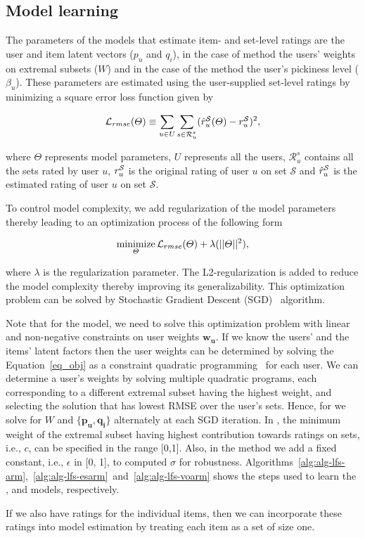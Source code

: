 \subsection{Model learning}\label{ch:lfs:model_learn}
The parameters of the models that estimate item- and set-level ratings are the
user and item latent vectors ($p_u$ and $q_i$), in the case of \ES method
the users' weights on extremal subsets ($W$) and in the case of the \VO method
the user's pickiness level ($\beta_u$). These parameters are estimated using the
user-supplied set-level ratings by minimizing a square error loss function given
by


%
\begin{equation} \label{eq_rmse}
  \mathcal{L}_{rmse}(\Theta) \equiv \sum_{u \in U} \sum_{\substack{s \in
  \mathcal{R}_{u}^s}} (\mbox{$\hat{r}_{u}^{\mathcal{S}}$}(\Theta) - \mbox{$r_{u}^{\mathcal{S}}$})^2,
\end{equation}
%


\noindent where $\Theta$ represents model parameters, $U$ represents all the users, $\mathcal{R}_{u}^s$ contains all the sets rated 
by user $u$, $\mbox{$r_{u}^{\mathcal{S}}$}$ is the original rating of user $u$ on set $\mathcal{S}$ 
and $\mbox{$\hat{r}_{u}^{\mathcal{S}}$}$ is the estimated rating of user $u$ on set $\mathcal{S}$.

To control model complexity, we add regularization of the model parameters
thereby leading to an optimization process of the following form

%
\begin{equation} \label{eq_obj}
  \minimize_{\Theta} \mathcal{L}_{rmse}(\Theta)  + \lambda (||\Theta||^2),
\end{equation}

%
\noindent where $\lambda$ is the regularization parameter. The L2-regularization is added to 
reduce the model complexity thereby improving its generalizability. 
This optimization problem can be solved by Stochastic Gradient Descent
(SGD)~\cite{r22} algorithm. 


Note that for the \ES model, we
need to solve this optimization problem with linear and non-negative constraints
on user weights $\bm{w_u}$. If we know the users' and the items' latent factors
then the user weights can be determined by solving the Equation~\ref{eq_obj} as
a constraint quadratic programming~\cite{boyd2004convex} for each user. 
We can determine a user's weights by solving multiple quadratic programs, each
corresponding to a different extremal subset having the highest weight, and
selecting the solution that has lowest RMSE over the user's sets.
Hence, for \ES we solve for $W$ and $\{\bm{p_u}, \bm{q_i}\}$ alternately at each SGD iteration. 
In \ES, the minimum weight of the extremal subset having highest contribution towards
ratings on sets, i.e., $c$, can be specified in the range [0,1].
Also, in the \VO method 
we add a fixed constant, i.e., $\epsilon$ in [0, 1], to computed $\sigma$ for robustness.
Algorithms~\ref{alg:alg-lfs-arm},~\ref{alg:alg-lfs-esarm}~and~\ref{alg:alg-lfs-voarm}
shows the steps used to learn the \ARM,
\ES and \VO models, respectively.

If we also have ratings for the individual items, then we can incorporate these
ratings into model estimation by treating each item as a set of size one. 

